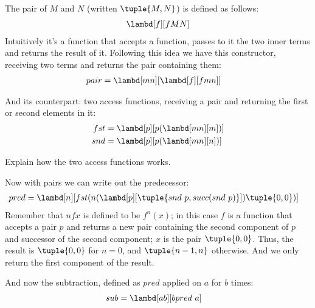 \documentclass[../../../include/open-logic-section]{subfiles}
\begin{document}

The pair of $M$ and $N$ (written $\tuple{M,N}$) is defined as follows:
\begin{align*}
  \lambd[f][fMN]
\end{align*}
Intuitively it's a function that accepts a function, passes to it the
two inner terms and returns the result of it. Following this idea we
have this constructor, receiving two terms and returns the pair
containing them:
\begin{align*}
  {pair} &= \lambd[mn][\lambd[f][fmn]]
\end{align*}

And its counterpart: two access functions, receiving a pair and
returning the first or second elements in it:
\begin{align*}
  {fst} &= \lambd[p][p(\lambd[mn][m])]\\
  {snd} &= \lambd[p][p(\lambd[mn][n])]
\end{align*}

\begin{prob}
  Explain how the two access functions works.
\end{prob}

Now with pairs we can write out the predecessor:
\begin{align*}
  {pred} &= \lambd[n][{fst}(n (\lambd[p][\tuple{{snd}~ {p}, {succ}({snd} ~{p})}]) \tuple{0, 0})]
\end{align*}
Remember that $n f x$ is defined to be $f^{n}(x)$; in this
case $f$ is a function that accepts a pair $p$ and returns a new
pair containing the second component of $p$ and successor of the
second component; $x$ is the pair $\tuple{0,0}$. Thus, the
result is $\tuple{0,0}$ for $n=0$, and $\tuple{{n-1}, n}$
otherwise. And we only return the first component of the result.

And now the subtraction, defined as $pred$ applied on $a$ for $b$ times:
\begin{align*}
  {sub} &= \lambd[ab][b {pred} ~ a]
\end{align*}
\end{document}
